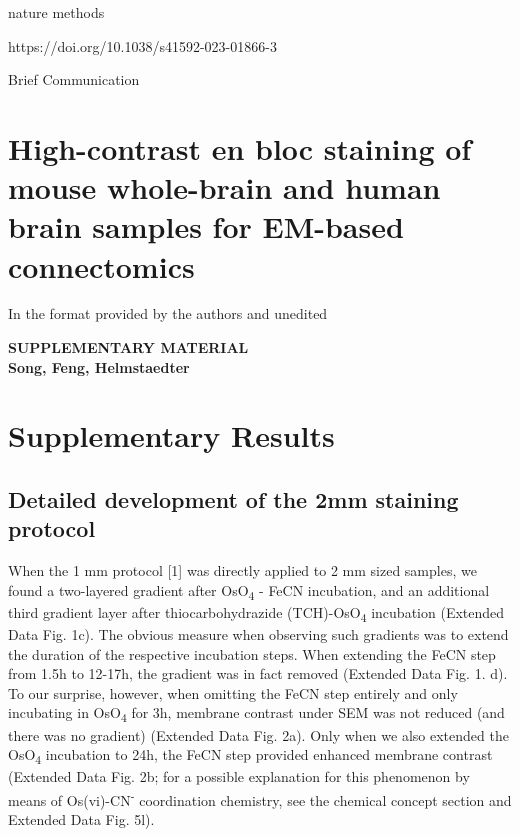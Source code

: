 \documentclass{article}
\begin{document}

\noindent nature methods\par
\noindent https://doi.org/10.1038/s41592-023-01866-3\par
\noindent Brief Communication\par

\section*{High-contrast en bloc staining of mouse whole-brain and human brain samples for EM-based connectomics}

\noindent In the format provided by the authors and unedited

\begin{center}\textbf{SUPPLEMENTARY MATERIAL}\\[4pt]\textbf{Song, Feng, Helmstaedter}\end{center}

\section*{Supplementary Results}


\subsection*{Detailed development of the 2mm staining protocol}


When the 1 mm protocol [1] was directly applied to 2 mm sized samples, we found a two-layered gradient after OsO\textsubscript{4} - FeCN incubation, and an additional third gradient layer after thiocarbohydrazide (TCH)-OsO\textsubscript{4} incubation (Extended Data Fig. 1c). The obvious measure when observing such gradients was to extend the duration of the respective incubation steps. When extending the FeCN step from 1.5h to 12-17h, the gradient was in fact removed (Extended Data Fig. 1. d). To our surprise, however, when omitting the FeCN step entirely and only incubating in OsO\textsubscript{4} for 3h, membrane contrast under SEM was not reduced (and there was no gradient) (Extended Data Fig. 2a). Only when we also extended the OsO\textsubscript{4} incubation to 24h, the FeCN step provided enhanced membrane contrast (Extended Data Fig. 2b; for a possible explanation for this phenomenon by means of Os(vi)-CN\textsuperscript{-} coordination chemistry, see the chemical concept section and Extended Data Fig. 5l). 
\end{document}
